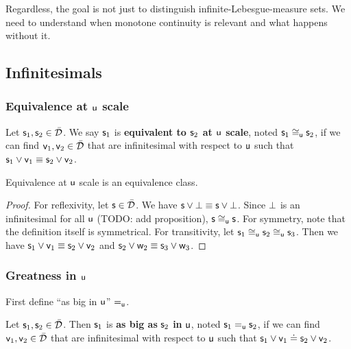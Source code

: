 \documentclass[11pt]{article}
\begin{document}
Regardless, the goal is not just to distinguish infinite-Lebesgue-measure sets. We need to understand when monotone continuity is relevant and what happens without it. 

\subsection{Infinitesimals}

\subsubsection{Equivalence at $\stmt[u]$ scale}

\def\equivu{\cong_{\stmt[u]}}

\begin{defn}
Let $\stmt_1, \stmt_2 \in \tdomain$. We say $\stmt_1$ is \textbf{equivalent to $\stmt_2$ at $\stmt[u]$ scale}, noted $\stmt_1 \equivu \stmt_2$, if we can find $\stmt[v]_1, \stmt[v]_2 \in \tdomain$ that are infinitesimal with respect to $\stmt[u]$ such that $\stmt_1 \OR \stmt[v]_1 \equiv \stmt_2 \OR \stmt[v]_2$.
\end{defn}

\begin{prop}
Equivalence at $\stmt[u]$ scale is an equivalence class.
\end{prop}
\begin{proof}
For reflexivity, let $\stmt \in \tdomain$. We have $\stmt \OR \impossibility \equiv \stmt \OR \impossibility$. Since $\impossibility$ is an infinitesimal for all $\stmt[u]$ (TODO: add proposition), $\stmt \equivu \stmt$. For symmetry, note that the definition itself is symmetrical. For transitivity, let $\stmt_1 \equivu \stmt_2 \equivu \stmt_3$. Then we have $\stmt_1 \OR \stmt[v]_1 \equiv \stmt_2 \OR \stmt[v]_2$ and $\stmt_2 \OR \stmt[w]_2 \equiv \stmt_3 \OR \stmt[w]_3$.
\end{proof}

\subsubsection{Greatness in $\stmt[u]$}

First define ``as big in $\stmt[u]$'' $\equ$.

\begin{defn}
Let $\stmt_1, \stmt_2 \in \tdomain$. Then $\stmt_1$ is \textbf{as big as} $\stmt_2$ \textbf{in} $\stmt[u]$, noted $\stmt_1 \equ \stmt_2$, if we can find $\stmt[v]_1, \stmt[v]_2 \in \tdomain$ that are infinitesimal with respect to $\stmt[u]$ such that $\stmt_1 \OR \stmt[v]_1 \eqgran \stmt_2 \OR \stmt[v]_2$.
\end{defn}
\end{document}
